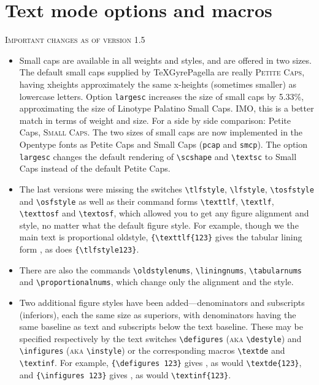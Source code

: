 \documentclass[11pt]{article}
\theoremstyle{oldplain}
\theoremstyle{plain}
\def\pcf{\addfontfeatures{Letters=PetiteCaps}}
\begin{document}
\section{Text mode options and macros}
\textsc{Important changes as of version 1.5}
\begin{itemize}
\item
 Small caps are available in all weights and styles, and are offered in two sizes. The default small caps supplied by TeXGyrePagella are really \textsc{Petite Caps}, having xheights approximately the same x-heights (sometimes smaller) as lowercase letters. Option \texttt{largesc} increases the size of small caps by  5.33\%, approximating the size of Linotype Palatino Small Caps. IMO, this is a better match in terms of weight and size. For a side by side comparison: {\pcf Petite Caps}, \textsc{Small Caps}. The two sizes of small caps are now implemented in the Opentype fonts as Petite Caps and Small Caps ({\tt pcap} and {\tt smcp}). The option {\tt largesc} changes the default rendering of \verb|\scshape| and \verb|\textsc| to Small Caps instead of the default Petite Caps. 
 
\item The last versions were missing the switches \verb|\tlfstyle|,  \verb|\lfstyle|, \verb|\tosfstyle| and \verb|\osfstyle| as well as their command forms  \verb|\texttlf|,  \verb|\textlf|, \verb|\texttosf| and  \verb|\textosf|, which allowed you to get any figure alignment and style, no matter what the default figure style. For example, though we the main text is proportional oldstyle, \verb|{\texttlf{123}| gives the tabular lining form , as does \verb|{\tlfstyle123}|.

\item There are also the commands \verb|\oldstylenums|, \verb|\liningnums|, \verb|\tabularnums| and \verb|\proportionalnums|, which change only the alignment and the style.

\item Two additional figure styles have been added---denominators and subscripts (inferiors), each the same size as superiors, with denominators having the same baseline as text and subscripts below the text baseline.  These may be specified  respectively by the text switches \verb|\defigures| (\textsc{aka} \verb|\destyle|) and \verb|\infigures| (\textsc{aka} \verb|\instyle|) or the corresponding macros \verb|\textde| and  \verb|\textinf|. For example, \verb|{\defigures 123}| gives {}, as would \verb|\textde{123}|, and  \verb|{\infigures 123}| gives {}, as would \verb|\textinf{123}|.


\end{itemize}
\end{document}
